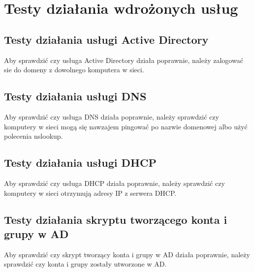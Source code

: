 	\newpage
\section{Testy działania wdrożonych usług}	%
\clearpage

\subsection{Testy działania usługi Active Directory}

Aby sprawdzić czy usługa Active Directory działa poprawnie, należy zalogować sie do domeny z dowolnego komputera w sieci.


\clearpage

\subsection{Testy działania usługi DNS}

Aby sprawdzić czy usługa DNS działa poprawnie, należy sprawdzić czy komputery w sieci mogą się nawzajem pingować po nazwie domenowej albo użyć polecenia nslookup.




\clearpage

\subsection{Testy działania usługi DHCP}

Aby sprawdzić czy usługa DHCP działa poprawnie, należy sprawdzić czy komputery w sieci otrzymują adresy IP z serwera DHCP.

\clearpage

\subsection{Testy działania skryptu tworzącego konta i grupy w AD}

Aby sprawdzić czy skrypt tworzący konta i grupy w AD działa poprawnie, należy sprawdzić czy konta i grupy zostały utworzone w AD.

